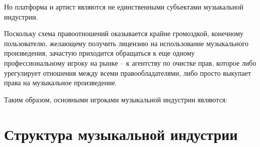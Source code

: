 \documentclass[12pt]{report}
\begin{document}
Но платформа и артист являются не единственными субъектами музыкальной индустрии.

Поскольку схема правоотношений оказывается крайне громоздкой, конечному пользователю, желающему получить лицензию на использование музыкального произведения, зачастую приходится обращаться к еще одному профессиональному игроку на рынке – к агентству по очистке прав, которое либо урегулирует отношения между всеми правообладателями, либо просто выкупает права на музыкальное произведение.

Таким образом, основными игроками музыкальной индустрии являются:

\vfill\null\pagebreak
\section{Структура музыкальной индустрии}
\label{industry-structure}
\end{document}
